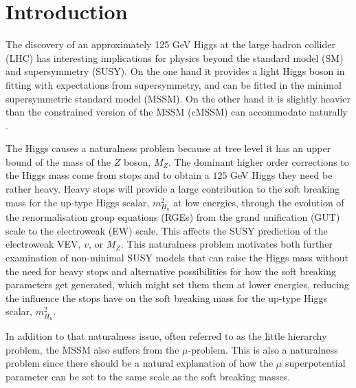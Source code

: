 \documentclass[preprint,amsmath,amssymb,aps,superscriptaddress,prd,showpacs,floatfix,nofootinbib]{revtex4-1}
\begin{document}
\maketitle

\section{\label{sec:intro}Introduction}
The discovery of an approximately 125 GeV Higgs
\cite{Aad:2012tfa,Chatrchyan:2012ufa} at the large hadron collider
(LHC) has interesting implications for physics beyond the standard
model (SM) and supersymmetry (SUSY).  On the one hand it provides a
light Higgs boson in fitting with expectations from supersymmetry, and
can be fitted in the minimal supersymmetric standard model (MSSM).  On
the other hand it is slightly heavier than the constrained version of the 
MSSM (cMSSM) can accommodate naturally \cite{Cassel:2011zd,Ghilencea:2012gz}.

The Higgs causes a naturalness problem because at tree level it has an
upper bound of the mass of the $Z$ boson, $M_Z$. The dominant higher
order corrections to the Higgs mass come from stops and to obtain a
$125$ GeV Higgs they need be rather heavy. Heavy stops will provide a
large contribution to the soft breaking mass for the up-type Higgs
scalar, $m_{H_u}^2$ at low energies, through the evolution of the
renormalisation group equations (RGEs) from the grand unification
(GUT) scale to the electroweak (EW) scale. This affects the SUSY
prediction of the electroweak VEV, $v$, or $M_Z$.  This naturalness
problem motivates both further examination of non-minimal SUSY models
that can raise the Higgs mass without the need for heavy stops and
alternative possibilities for how the soft breaking parameters get
generated, which might set them them at lower energies, reducing the
influence the stops have on the soft breaking mass for the up-type
Higgs scalar, $m_{H_u}^2$.

In addition to that naturalness issue, often referred to as the little
hierarchy problem, the MSSM also suffers from the $\mu$-problem. This
is also a naturalness problem since there should be a natural explanation
of how the $\mu$ superpotential parameter can be set to the same scale
as the soft breaking masses.
\end{document}
